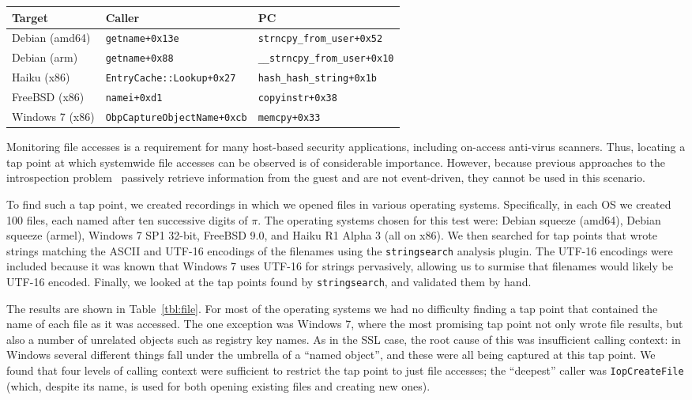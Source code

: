 \begin{table*}
    \centering
    \small
    \begin{tabular}{|l|l|l|}
        \hline
        Target & Caller & PC \\
        \hline
        Debian (amd64) & \texttt{getname+0x13e} & \texttt{strncpy\_from\_user+0x52} \\ 
        Debian (arm) & \texttt{getname+0x88} & \texttt{\_\_strncpy\_from\_user+0x10} \\
        Haiku (x86) & \texttt{EntryCache::Lookup+0x27} & \texttt{hash\_hash\_string+0x1b} \\
        FreeBSD (x86) & \texttt{namei+0xd1} & \texttt{copyinstr+0x38} \\
        Windows 7 (x86) & \texttt{ObpCaptureObjectName+0xcb} & \texttt{memcpy+0x33} \\
        \hline
    \end{tabular}
\caption{Tap points found for file access on different operating systems.}
\label{tbl:file}
\end{table*}

Monitoring file accesses is a requirement for many host-based security
applications, including on-access anti-virus scanners. Thus, locating a
tap point at which systemwide file accesses can be observed is of
considerable importance. However, because previous approaches to the
introspection problem~\cite{Dolan-Gavitt:2011uq,Fu:2012fk} passively
retrieve information from the guest and are not event-driven, they
cannot be used in this scenario.

To find such a tap point, we created recordings in which we opened files
in various operating systems. Specifically, in each OS we created 100
files, each named after ten successive digits of $\pi$. The operating
systems chosen for this test were: Debian squeeze (amd64), Debian
squeeze (armel), Windows 7 SP1 32-bit, FreeBSD 9.0, and Haiku R1 Alpha
3 (all on x86). We then searched for tap points that wrote strings
matching the ASCII and UTF-16 encodings of the filenames using the
\texttt{stringsearch} analysis plugin. The UTF-16 encodings were
included because it was known that Windows 7 uses UTF-16 for strings
pervasively, allowing us to surmise that filenames would likely be
UTF-16 encoded. Finally, we looked at the tap points found by
\texttt{stringsearch}, and validated them by hand.

The results are shown in Table~\ref{tbl:file}. For most of the operating
systems we had no difficulty finding a tap point that contained the name
of each file as it was accessed. The one exception was Windows 7, where
the most promising tap point not only wrote file results, but also a
number of unrelated objects such as registry key names. As in the SSL
case, the root cause of this was insufficient calling context: in
Windows several different things fall under the umbrella of a ``named
object'', and these were all being captured at this tap point. We found
that four levels of calling context were sufficient to restrict the tap
point to just file accesses; the ``deepest'' caller was
\texttt{IopCreateFile} (which, despite its name, is used for both
opening existing files and creating new ones).

